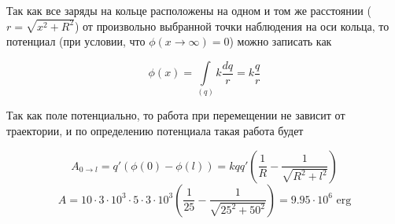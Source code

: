 \documentclass[a5paper,10pt]{article}\usepackage[usenames,dvipsnames]{color}\usepackage{extsizes,cmap,graphicx,misccorr,indentfirst,makecell,multirow,ulem,geometry,amssymb,amsfonts,amsmath,amsthm,titlesec,float,fancyhdr,wrapfig,tikz,pgfplots}\usepackage[T2A]{fontenc}\usepackage[utf8x]{inputenc}\usepackage[english, russian]{babel}\usetikzlibrary{decorations.pathreplacing,decorations.pathmorphing,patterns,calc,scopes,arrows,through,positioning,shapes.misc}\graphicspath{{img/}}\linespread{1.3}\frenchspacing\geometry{left=1cm, right=1cm, top=2cm, bottom=1cm, bindingoffset=0cm}\pagestyle{fancy}\fancyhead{}\fancyhead[R]{Сарафанов Ф.Г.}
\newcommand{\lineann}[4][0.5]{%
    \begin{scope}[rotate=#2, blue,inner sep=2pt]
        \draw[dashed, blue!40] (0,0) -- +(0,#1)
            node [coordinate, near end] (a) {};
        \draw[dashed, blue!40] (#3,0) -- +(0,#1)
            node [coordinate, near end] (b) {};
        \draw[|<->|] (a) -- node[fill=white] {#4} (b);
    \end{scope}
}
\begin{document}
\begin{figure}[H]
    \centering
\end{figure}

Так как все заряды на кольце расположены на одном и том же расстоянии ($r=\sqrt{x^2+R^2}$) от произвольно выбранной точки наблюдения на оси кольца, то потенциал (при условии, что $\phi(x\to\infty)=0$) можно записать как

\begin{equation}
    \phi(x)=\int\limits_{(q)} k\frac{dq}{r}=k\frac{q}{r}
\end{equation}

Так как поле потенциально, то работа при перемещении не зависит от траектории, и по определению  потенциала такая работа будет

\begin{equation}
    A_{0\to l}=q'(\phi(0)-\phi(l))=kqq'(\frac{1}{R}-\frac{1}{\sqrt{R^2+l^2}})
\end{equation}
\begin{equation}
    A=10\cdot3\cdot10^3\cdot5\cdot3\cdot10^3(\frac{1}{25}-\frac{1}{\sqrt{25^2+50^2}})=9.95\cdot10^6 \text{ erg}
\end{equation}
\end{document}

